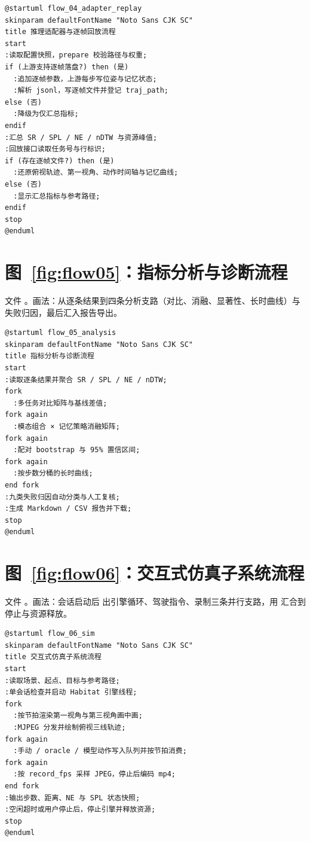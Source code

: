 \begin{lstlisting}[style=navplain]
@startuml flow_04_adapter_replay
skinparam defaultFontName "Noto Sans CJK SC"
title 推理适配器与逐帧回放流程
start
:读取配置快照，prepare 校验路径与权重;
if (上游支持逐帧落盘?) then (是)
  :追加逐帧参数，上游每步写位姿与记忆状态;
  :解析 jsonl，写逐帧文件并登记 traj_path;
else (否)
  :降级为仅汇总指标;
endif
:汇总 SR / SPL / NE / nDTW 与资源峰值;
:回放接口读取任务号与行标识;
if (存在逐帧文件?) then (是)
  :还原俯视轨迹、第一视角、动作时间轴与记忆曲线;
else (否)
  :显示汇总指标与参考路径;
endif
stop
@enduml
\end{lstlisting}
\section{图~\ref{fig:flow05}：指标分析与诊断流程}

文件 。画法：从逐条结果到四条分析支路（对比、消融、显著性、长时曲线）与失败归因，最后汇入报告导出。

\begin{lstlisting}[style=navplain]
@startuml flow_05_analysis
skinparam defaultFontName "Noto Sans CJK SC"
title 指标分析与诊断流程
start
:读取逐条结果并聚合 SR / SPL / NE / nDTW;
fork
  :多任务对比矩阵与基线差值;
fork again
  :模态组合 × 记忆策略消融矩阵;
fork again
  :配对 bootstrap 与 95% 置信区间;
fork again
  :按步数分桶的长时曲线;
end fork
:九类失败归因自动分类与人工复核;
:生成 Markdown / CSV 报告并下载;
stop
@enduml
\end{lstlisting}
\section{图~\ref{fig:flow06}：交互式仿真子系统流程}

文件 。画法：会话启动后  出引擎循环、驾驶指令、录制三条并行支路，用  汇合到停止与资源释放。

\begin{lstlisting}[style=navplain]
@startuml flow_06_sim
skinparam defaultFontName "Noto Sans CJK SC"
title 交互式仿真子系统流程
start
:读取场景、起点、目标与参考路径;
:单会话检查并启动 Habitat 引擎线程;
fork
  :按节拍渲染第一视角与第三视角画中画;
  :MJPEG 分发并绘制俯视三线轨迹;
fork again
  :手动 / oracle / 模型动作写入队列并按节拍消费;
fork again
  :按 record_fps 采样 JPEG，停止后编码 mp4;
end fork
:输出步数、距离、NE 与 SPL 状态快照;
:空闲超时或用户停止后，停止引擎并释放资源;
stop
@enduml
\end{lstlisting}
